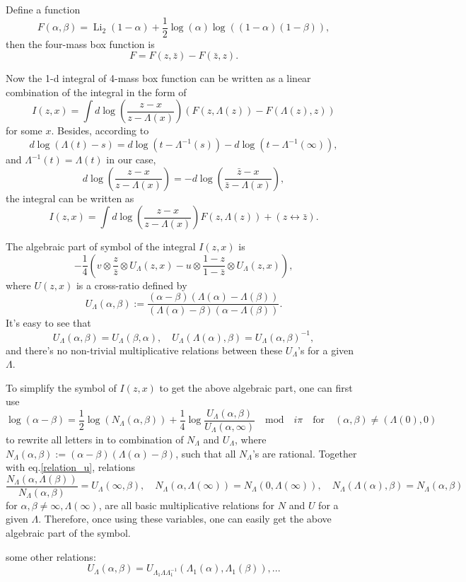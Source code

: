 \documentclass[10pt]{article}
\begin{document}
Define a function 
\[
	F(\alpha,\beta)=\operatorname{Li}_2(1-\alpha)+
	\frac{1}{2}\log(\alpha)\log((1-\alpha)(1-\beta)),
\]
then the four-mass box function is 
\[
	F=F(z,\bar z)-F(\bar z,z).
\]

Now the 1-d integral of 4-mass box function can be written as a linear combination 
of the integral in the form of
\[ 
	I(z,x)=\int d\log\left(\frac{z-x}{z-\Lambda(x)}\right) 
	(F(z,\Lambda(z))-F(\Lambda(z),z))
\]
for some $x$. Besides, according to 
\[
	d\log(\Lambda(t)-s)=d\log (t-\Lambda^{-1}(s)) - d \log(t-\Lambda^{-1}(\infty)),
\]
and $\Lambda^{-1}(t)=\Lambda(t)$ in our case,
\[
	d\log\left(\frac{z-x}{z-\Lambda(x)}\right)=-
	d\log\left(\frac{\bar z-x}{\bar z-\Lambda(x)}\right),
\]
the integral can be written as
\[
	I(z,x)=\int d\log\left(\frac{z-x}{z- \Lambda(x)}\right) 
	F(z,\Lambda(z)) +(z\leftrightarrow\bar z).
\]

The algebraic part of symbol of the integral $I(z,x)$ is
\[
	-\frac 14 \left(v\otimes \frac{z}{\bar z}\otimes U_\Lambda(z,x)-
	u\otimes \frac{1- z}{1-\bar z}\otimes U_\Lambda(z,x)\right),
\]
where $U(z,x)$ is a cross-ratio defined by
\[
	U_\Lambda(\alpha,\beta):=\frac{(\alpha-\beta)(\Lambda(\alpha)-\Lambda(\beta))}
	{(\Lambda(\alpha)-\beta)(\alpha-\Lambda(\beta))}.
\]
It's easy to see that
\begin{equation}\label{relation_u}
	U_\Lambda(\alpha,\beta)=U_\Lambda(\beta,\alpha),\quad 
	U_\Lambda(\Lambda(\alpha),\beta)=U_\Lambda(\alpha,\beta)^{-1},
\end{equation}
and there's no non-trivial multiplicative relations between these $U_\Lambda$'s for a
given $\Lambda$.

To simplify the symbol of $I(z,x)$ to get the above algebraic part, one can first use
\[
	\log(\alpha-\beta)=\frac 12\log\left(N_\Lambda(\alpha,\beta)\right)
	+\frac 14 \log\frac{U_\Lambda(\alpha,\beta)}{U_\Lambda(\alpha,\infty)} 
	\quad \text{mod}\quad i\pi\quad \text{for}\quad  (\alpha,\beta)\neq (\Lambda(0),0)
\]
to rewrite all letters in to combination of $N_\Lambda$ and $U_\Lambda$, where $N_\Lambda(\alpha,\beta):=(\alpha-\beta)(\Lambda(\alpha)-\beta)$, such that all $N_\Lambda$'s are rational.
Together with eq.\eqref{relation_u}, relations
\[
	\frac{N_\Lambda(\alpha,\Lambda(\beta))}{N_\Lambda(\alpha,\beta)}=
	U_\Lambda(\infty,\beta),
	\quad N_\Lambda(\alpha,\Lambda(\infty))=N_\Lambda(0,\Lambda(\infty)),
	\quad N_\Lambda(\Lambda(\alpha),\beta)=N_\Lambda(\alpha,\beta)
\]
for $\alpha,\beta\neq \infty,\Lambda(\infty)$, are all basic multiplicative relations for
$N$ and $U$ for a given $\Lambda$. Therefore, once using these variables, 
one can easily get the above algebraic part of the symbol.

some other relations:
\[
	U_{\Lambda}(\alpha,\beta)
	=U_{\Lambda_1\Lambda\Lambda_1^{-1}}(\Lambda_1(\alpha),\Lambda_1(\beta)),...
\]
\end{document}
